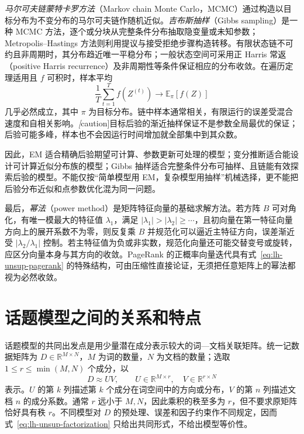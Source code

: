 \emph{马尔可夫链蒙特卡罗方法}（Markov chain Monte Carlo，MCMC）通过构造以目标分布为不变分布的马尔可夫链作随机近似。\emph{吉布斯抽样}（Gibbs sampling）是一种 MCMC 方法，逐个或分块从完整条件分布抽取隐变量或未知参数；Metropolis--Hastings 方法则利用提议与接受拒绝步骤构造转移。有限状态链不可约且非周期时，其分布趋近唯一平稳分布；一般状态空间可采用正 Harris 常返（positive Harris recurrence）及非周期性等条件保证相应的分布收敛。在遍历定理适用且 $f$ 可积时，样本平均
\begin{equation}
\label{eq:lh-unsup-mcmc-average}
    \frac1T\sum_{t=1}^{T}f(Z^{(t)})
    \longrightarrow\mathbb E_{\pi}[f(Z)]
\end{equation}
几乎必然成立，其中 $\pi$ 为目标分布。链中样本通常相关，有限运行的误差受混合速度和自相关影响。\emph[caution]{目标后验的渐近抽样保证不是参数全局最优的保证}；后验可能多峰，样本也不会因运行时间增加就全部集中到其众数。

因此，EM 适合精确后验期望可计算、参数更新可处理的模型；变分推断适合能设计可计算近似分布族的模型；Gibbs 抽样适合完整条件分布可抽样、且链能有效探索后验的模型。不能仅按“简单模型用 EM，复杂模型用抽样”机械选择，更不能把后验分布近似和点参数优化混为同一问题。

最后，\emph{幂法}（power method）是矩阵特征向量的基础求解方法。若方阵 $B$ 可对角化，有唯一模最大的特征值 $\lambda_1$，满足 $|\lambda_1|>|\lambda_2|\geq\cdots$，且初向量在第一特征向量方向上的展开系数不为零，则反复乘 $B$ 并规范化可以逼近主特征方向，误差渐近受 $|\lambda_2/\lambda_1|$ 控制。若主特征值为负或非实数，规范化向量还可能交替变号或旋转，应区分向量本身与其方向的收敛。PageRank 的正概率向量迭代具有式~\eqref{eq:lh-unsup-pagerank} 的特殊结构，可由压缩性直接论证，无须把任意矩阵上的幂法都视为必然收敛。

\section{话题模型之间的关系和特点}
\label{sec:lh-unsup-topic-relations}

话题模型的共同出发点是用少量潜在成分表示较大的词---文档关联矩阵。统一记数据矩阵为 $D\in\mathbb R^{M\times N}$，$M$ 为词的数量，$N$ 为文档的数量；选取 $1\leq r\leq\min(M,N)$ 个成分，以
\begin{equation}
\label{eq:lh-unsup-factorization}
    D\approx UV,\qquad U\in\mathbb R^{M\times r},\quad
    V\in\mathbb R^{r\times N}
\end{equation}
表示。$U$ 的第 $k$ 列描述第 $k$ 个成分在词空间中的方向或分布，$V$ 的第 $n$ 列描述文档 $n$ 的成分系数。通常 $r$ 远小于 $M,N$，因此乘积的秩至多为 $r$，但不要求原矩阵恰好具有秩 $r$。不同模型对 $D$ 的预处理、误差和因子约束作不同规定，因而式~\eqref{eq:lh-unsup-factorization} 只给出共同形式，不给出模型等价性。

